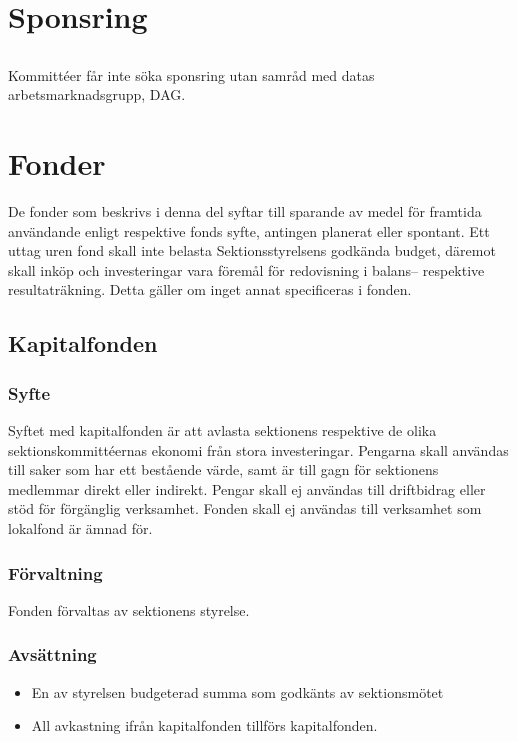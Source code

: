 \documentclass[a4paper, 10pt]{article}
\begin{document}
\section{Sponsring}
\subsection{}
Kommittéer får inte söka sponsring utan samråd med datas
arbetsmarknadsgrupp, DAG.

\section{Fonder}
De fonder som beskrivs i denna del syftar till sparande av medel för framtida användande enligt respektive fonds syfte, antingen planerat eller spontant. Ett uttag uren fond skall inte belasta Sektionsstyrelsens godkända budget, däremot skall inköp och investeringar vara föremål för redovisning i balans– respektive resultaträkning. Detta gäller om inget annat specificeras i fonden.
\subsection{Kapitalfonden}
\subsubsection{Syfte}
\label{sec:kapitalfond_syfte}
Syftet med kapitalfonden är att avlasta sektionens respektive de olika sektionskommittéernas ekonomi från stora investeringar. Pengarna skall användas till saker som har ett bestående värde, samt är till gagn för sektionens medlemmar direkt eller indirekt. Pengar skall ej användas till driftbidrag eller stöd för förgänglig verksamhet. Fonden skall ej användas till verksamhet som lokalfond är ämnad för.
\subsubsection{Förvaltning}
Fonden förvaltas av sektionens styrelse.
\subsubsection{Avsättning}
\begin{itemize}
\item En av styrelsen budgeterad summa som godkänts av sektionsmötet
\item All avkastning ifrån kapitalfonden tillförs kapitalfonden.
\end{itemize}
\end{document}
